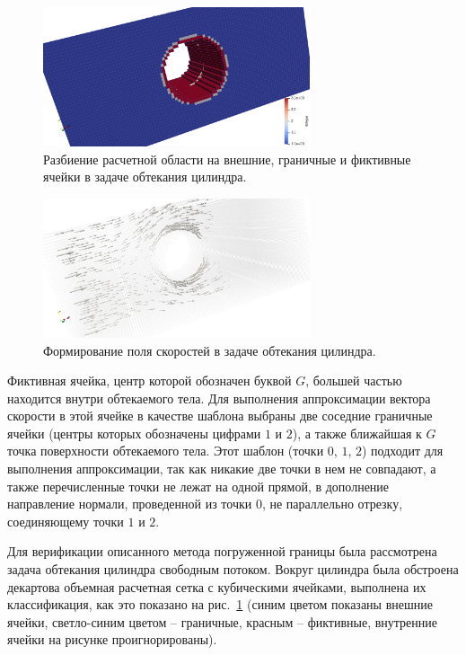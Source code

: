 \begin{figure}[ht]
\centering
\includegraphics[width=0.7\textwidth]{./pics/text_1_immersed_boundary_method/3d_mesh.png}
\singlespacing
{}\caption{Разбиение расчетной области на внешние, граничные и фиктивные ячейки в задаче обтекания
цилиндра.}
\label{fig:text_1_immersed_boundary_method_3}
\end{figure}

\begin{figure}[ht]
\centering
\includegraphics[width=0.7\textwidth]{./pics/text_1_immersed_boundary_method/velocity_field.png}
\singlespacing
{}\caption{Формирование поля скоростей в задаче обтекания цилиндра.}
\label{fig:text_1_immersed_boundary_method_4}
\end{figure}

Фиктивная ячейка, центр которой обозначен буквой $G$, большей частью находится внутри обтекаемого тела.
Для выполнения аппроксимации вектора скорости в этой ячейке в качестве шаблона выбраны две соседние граничные ячейки (центры которых обозначены цифрами $1$ и $2$), а также ближайшая к $G$ точка поверхности обтекаемого тела.
Этот шаблон (точки $0$, $1$, $2$) подходит для выполнения аппроксимации, так как никакие две точки в нем не совпадают, а также перечисленные точки не лежат на одной прямой, в дополнение направление нормали, проведенной из точки $0$, не параллельно отрезку, соединяющему точки $1$ и $2$.

Для верификации описанного метода погруженной границы была рассмотрена задача обтекания цилиндра свободным потоком.
Вокруг цилиндра была обстроена декартова объемная расчетная сетка с кубическими ячейками, выполнена их классификация, как это показано на рис.~\ref{fig:text_1_immersed_boundary_method_3} (синим цветом показаны внешние ячейки, светло-синим цветом -- граничные, красным -- фиктивные, внутренние ячейки на рисунке проигнорированы).

